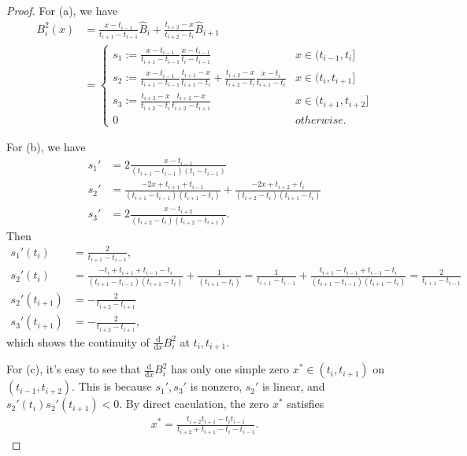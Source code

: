 \documentclass{article}
\newcommand{\dif}{\mathrm{d}}
\newcommand{\difFrac}[2]{\frac{\dif #1}{\dif #2}}
\newcommand{\RNum}[1]{\uppercase\expandafter{\romannumeral #1\relax}}
\begin{document}
\RNum{5}
\begin{proof}
  For (a), we have 
  \begin{align*}
    B_i^2(x)&=\frac{x-t_{i-1}}{t_{i+1}-t_{i-1}}\hat{B}_i+\frac{t_{i+2}-x}{t_{i+2}-t_{i}}\hat{B}_{i+1}\\
    &=\left\{\begin{array}{lc}s_1:=\frac{x-t_{i-1}}{t_{i+1}-t_{i-1}}\frac{x-t_{i-1}}{t_i-t_{i-1}}&x\in(t_{i-1},t_i\rbrack\\s_2:=\frac{x-t_{i-1}}{t_{i+1}-t_{i-1}}\frac{t_{i+1}-x}{t_{i+1}-t_i}+\frac{t_{i+2}-x}{t_{i+2}-t_i}\frac{x-t_i}{t_{i+1}-t_{i}}&x\in(t_i,t_{i+1}\rbrack\\s_3:=\frac{t_{i+2}-x}{t_{i+2}-t_i}\frac{t_{i+2}-x}{t_{i+2}-t_{i+1}}&x\in(t_{i+1},t_{i+2}\rbrack\\0&otherwise.\end{array}\right.  
  \end{align*}

  For (b), we have
  \begin{align*}
    s_1' &=  2\frac{x-t_{i-1}}{(t_{i+1}-t_{i-1})(t_i-t_{i-1})}\\
    s_2' &= \frac{-2x+t_{i+1}+t_{i-1}}{(t_{i+1}-t_{i-1})(t_{i+1}-t_i)}+\frac{-2x+t_{i+2}+t_i}{(t_{i+2}-t_i)(t_{i+1}-t_i)}\\
    s_3' &= 2\frac{x-t_{i+2}}{(t_{i+2}-t_{i})(t_{i+2}-t_{i+1})}.
  \end{align*}
  Then 
  \begin{align*}
  s_1'(t_i)&= \frac{2}{t_{i+1}-t_{i-1}},\\
  s_2'(t_i)&= \frac{-t_i+t_{i+1}+t_{i-1}-t_i}{(t_{i+1}-t_{i-1})(t_{i+1}-t_i)}+\frac{1}{(t_{i+1}-t_i)}=\frac{1}{t_{i+1}-t_{i-1}}+\frac{t_{i+1}-t_{i-1}+t_{i-1}-t_i}{(t_{i+1}-t_{i-1})(t_{i+1}-t_i)}=\frac{2}{t_{i+1}-t_{i-1}}\\
  s_2'(t_{i+1})&= -\frac{2}{t_{i+2}-t_{i+1}}\\
  s_3'(t_{i+1})&= -\frac{2}{t_{i+2}-t_{i+1}},
  \end{align*}
  which shows the continuity of $\difFrac{}{x}B_i^2$ at $t_i,t_{i+1}$.

  For (c), it's easy to see that $\difFrac{}{x}B_i^2$ has only one simple zero $x^* \in (t_{i},t_{i+1})$ on $(t_{i-1},t_{i+2})$. This is because $s_1',s_3'$ is nonzero,
   $s_2'$ is linear, and $s_2'(t_i)s_2'(t_{i+1})<0$. By direct caculation, the zero $x^*$ satisfies 
   \begin{align*}
     x^*=\frac{t_{i+2}t_{i+1}-t_i t_{i-1}}{t_{i+2}+t_{i+1}-t_i-t_{i-1}}.
   \end{align*}


\end{proof}
\end{document}
